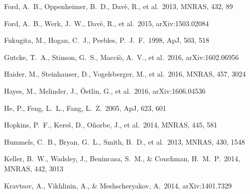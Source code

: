 \documentclass[useAMS,usenatbib]{mn2e}
\def \apj {ApJ}
\def \mnras {MNRAS}
\begin{document}
\begin{thebibliography}{}

    

%
 Ford, A.~B., Oppenheimer, B.~D., Dav{\`e}, R., et al.\ 2013, \mnras, 432, 89

%
 Ford, A.~B., Werk, J.~W., Dav{\`e}, R., et al.\ 2015, arXiv:1503.02084

 Fukugita, M., Hogan, C.~J., Peebles, P.~J.~F.\ 1998, \apj, 503, 518


 Gutcke, T.~A., Stinson, G.~S., Macci{\`o}, A.~V., et al.\ 2016, arXiv:1602.06956



Haider, M., Steinhauser, D., Vogelsberger, M., et al.\ 2016, \mnras, 457, 3024

Hayes, M., Melinder, J., {\"O}stlin, G., et al.\ 2016, arXiv:1606.04536

He, P., Feng, L.~L., Fang, L.~Z.\ 2005, \apj, 623, 601

 Hopkins, P.~F., Kere{\v s}, D., O{\~n}orbe, J., et al.\ 2014, \mnras, 445, 581 

%
 Hummels, C.~B., Bryan, G.~L., Smith, B.~D., et al.\ 2013, \mnras, 430, 1548




 Keller, B.~W., Wadsley, 
  J., Benincasa, S.~M., \& Couchman, H.~M.~P.\ 2014, \mnras, 442, 3013

 Kravtsov, A., 
Vikhlinin, A., \& Meshscheryakov, A.\ 2014, arXiv:1401.7329 


\end{thebibliography}
\end{document}
